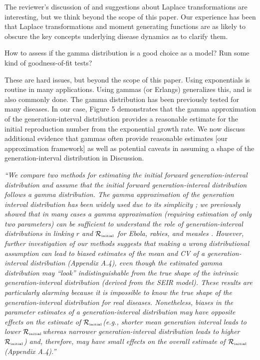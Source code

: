 \documentclass[12pt]{article}
\newcommand{\Rx}[1]{\ensuremath{{\cal R}_{#1}}}
\newcommand{\Rini}{\Rx{\textrm{\tiny initial}}}
\newcommand{\revtext}{\textsf}
\newcommand{\newtext}[1]{\textsl{``#1''}}
\begin{document}
The reviewer's discussion of and suggestions about Laplace transformations are interesting, but we think beyond the scope of this paper. Our experience has been that Laplace transformations and moment generating functions are as likely to obscure the key concepts underlying disease dynamics as to clarify them.

\revtext{How to assess if the gamma distribution is a good choice as a
model? Run some kind of goodness-of-fit tests?}

These are hard issues, but beyond the scope of this paper. 
Using exponentials is routine in many applications. 
Using gammas (or Erlangs) generalizes this, and is also commonly done. 
The gamma distribution has been previously tested for many diseases. 
In our case, Figure 5 demonstrates that the gamma approximation of the generation-interval distribution provides a reasonable estimate for the initial reproduction number from the exponential growth rate.
We now discuss additional evidence that gammas often provide reasonable estimates [our approximation framework] as well as potential caveats in assuming a shape of the generation-interval distribution in Discussion.

\newtext{We compare two methods for estimating the initial forward generation-interval distribution and assume that the initial forward generation-interval distribution follows a gamma distribution.
The gamma approximation of the generation interval distribution has been widely used due to its simplicity \citep{mcbryde2009early, nishiura2009transmission, roberts2011early, trichereau2012estimation, nishiura2015theoretical};
we previously showed that in many cases a gamma approximation (requiring estimation of only two parameters) can be sufficient to understand the role of generation-interval distributions in linking $r$ and $\Rini$ for Ebola, rabies, and measles \citep{park2019practical}.
However, further investigation of our methods suggests that making a wrong distributional assumption can lead to biased estimates of the mean and CV of a generation-interval distribution (Appendix A.4), even though the estimated gamma distribution may ``look'' indistinguishable from the true shape of the intrinsic generation-interval distribution (derived from the SEIR model).
These results are particularly alarming because it is impossible to know the true shape of the generation-interval distribution for real diseases.
Nonetheless, biases in the parameter estimates of a generation-interval distribution may have opposite effects on the estimate of \Rini (e.g., shorter mean generation interval leads to lower \Rini whereas narrower generation-interval distribution leads to higher \Rini) and, therefore, may have small effects on the overall estimate of $\Rini$ (Appendix A.4).}
\end{document}
